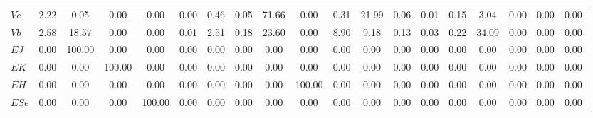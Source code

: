 \begin{center}
\begin{longtable}{lcccccccccccccccccc}
$Ve                 $	 & 	             2.22	 & 	             0.05	 & 	             0.00	 & 	             0.00	 & 	             0.00	 & 	             0.46	 & 	             0.05	 & 	            71.66	 & 	             0.00	 & 	             0.31	 & 	            21.99	 & 	             0.06	 & 	             0.01	 & 	             0.15	 & 	             3.04	 & 	             0.00	 & 	             0.00	 & 	             0.00 \\ 
$Vb                 $	 & 	             2.58	 & 	            18.57	 & 	             0.00	 & 	             0.00	 & 	             0.01	 & 	             2.51	 & 	             0.18	 & 	            23.60	 & 	             0.00	 & 	             8.90	 & 	             9.18	 & 	             0.13	 & 	             0.03	 & 	             0.22	 & 	            34.09	 & 	             0.00	 & 	             0.00	 & 	             0.00 \\ 
$EJ                 $	 & 	             0.00	 & 	           100.00	 & 	             0.00	 & 	             0.00	 & 	             0.00	 & 	             0.00	 & 	             0.00	 & 	             0.00	 & 	             0.00	 & 	             0.00	 & 	             0.00	 & 	             0.00	 & 	             0.00	 & 	             0.00	 & 	             0.00	 & 	             0.00	 & 	             0.00	 & 	             0.00 \\ 
$EK                 $	 & 	             0.00	 & 	             0.00	 & 	           100.00	 & 	             0.00	 & 	             0.00	 & 	             0.00	 & 	             0.00	 & 	             0.00	 & 	             0.00	 & 	             0.00	 & 	             0.00	 & 	             0.00	 & 	             0.00	 & 	             0.00	 & 	             0.00	 & 	             0.00	 & 	             0.00	 & 	             0.00 \\ 
$EH                 $	 & 	             0.00	 & 	             0.00	 & 	             0.00	 & 	             0.00	 & 	             0.00	 & 	             0.00	 & 	             0.00	 & 	             0.00	 & 	           100.00	 & 	             0.00	 & 	             0.00	 & 	             0.00	 & 	             0.00	 & 	             0.00	 & 	             0.00	 & 	             0.00	 & 	             0.00	 & 	             0.00 \\ 
$ESe                $	 & 	             0.00	 & 	             0.00	 & 	             0.00	 & 	           100.00	 & 	             0.00	 & 	             0.00	 & 	             0.00	 & 	             0.00	 & 	             0.00	 & 	             0.00	 & 	             0.00	 & 	             0.00	 & 	             0.00	 & 	             0.00	 & 	             0.00	 & 	             0.00	 & 	             0.00	 & 	             0.00 \\ 

\end{longtable}
\end{center}
